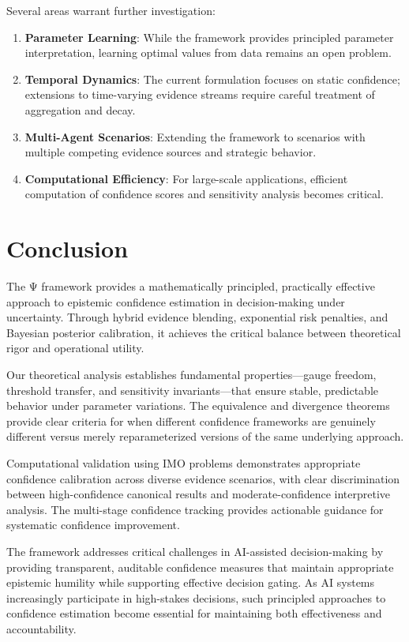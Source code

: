 \documentclass[12pt,a4paper]{article}
\begin{document}
Several areas warrant further investigation:

\begin{enumerate}
\item \textbf{Parameter Learning}: While the framework provides principled parameter interpretation, learning optimal values from data remains an open problem.

\item \textbf{Temporal Dynamics}: The current formulation focuses on static confidence; extensions to time-varying evidence streams require careful treatment of aggregation and decay.

\item \textbf{Multi-Agent Scenarios}: Extending the framework to scenarios with multiple competing evidence sources and strategic behavior.

\item \textbf{Computational Efficiency}: For large-scale applications, efficient computation of confidence scores and sensitivity analysis becomes critical.
\end{enumerate}

\section{Conclusion}

The Ψ framework provides a mathematically principled, practically effective approach to epistemic confidence estimation in decision-making under uncertainty. Through hybrid evidence blending, exponential risk penalties, and Bayesian posterior calibration, it achieves the critical balance between theoretical rigor and operational utility.

Our theoretical analysis establishes fundamental properties—gauge freedom, threshold transfer, and sensitivity invariants—that ensure stable, predictable behavior under parameter variations. The equivalence and divergence theorems provide clear criteria for when different confidence frameworks are genuinely different versus merely reparameterized versions of the same underlying approach.

Computational validation using IMO problems demonstrates appropriate confidence calibration across diverse evidence scenarios, with clear discrimination between high-confidence canonical results and moderate-confidence interpretive analysis. The multi-stage confidence tracking provides actionable guidance for systematic confidence improvement.

The framework addresses critical challenges in AI-assisted decision-making by providing transparent, auditable confidence measures that maintain appropriate epistemic humility while supporting effective decision gating. As AI systems increasingly participate in high-stakes decisions, such principled approaches to confidence estimation become essential for maintaining both effectiveness and accountability.
\end{document}
